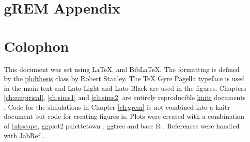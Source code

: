 
\appendix
\chapter{gREM Appendix}
\label{gremAppendix}




\chapter{Colophon}
\label{appendixlabel3}


This document was set using \LaTeX, \XeLaTeX\vspace{1mm} and Bib\LaTeX.
The formatting is defined by the \href{https://github.com/robjstan/latex-phdthesis}{phdthesis} class by Robert Stanley.
The TeX Gyre Pagella typeface is used in the main text and { Lato Light} and { \color[rgb]{0.75,0.75,0.75} Lato Black} are used in the figures.
Chapters \ref{ch:empirical}, \ref{ch:sims1} and \ref{ch:sims2} are entirely reproducible \href{http://yihui.name/knitr/}{knitr} documents \cite{knitr}.
Code for the simulations in Chapter \ref{ch:grem} is not combined into a knitr document but code for creating figures is.
Plots were created with a combination of \href{www.inkscape.org}{Inkscape}, ggplot2 \cite{ggplot2} palettetown \cite{palettetown}, ggtree \cite{ggtree} and base R \cite{R}.
References were handled with JabRef \cite{JabRef_software}. 

